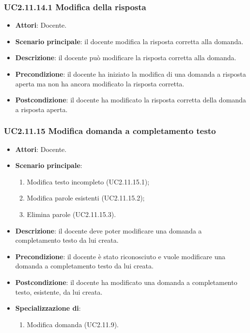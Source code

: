 \subsubsection{UC2.11.14.1 Modifica della risposta}
\begin{itemize}
\item \textbf{Attori}: Docente.
\item \textbf{Scenario principale}: il docente modifica la risposta corretta alla domanda.
\item \textbf{Descrizione}: il docente può modificare la risposta corretta alla domanda.
\item \textbf{Precondizione}: il docente ha iniziato la modifica di una domanda a risposta aperta ma non ha ancora modificato la risposta corretta.
\item \textbf{Postcondizione}: il docente ha modificato la risposta corretta della domanda a risposta aperta.
\end{itemize}
\subsubsection{UC2.11.15 Modifica domanda a completamento testo}
\begin{itemize}
\item \textbf{Attori}: Docente.
\item \textbf{Scenario principale}:
\begin{enumerate}
\item Modifica testo incompleto (UC2.11.15.1);
\item Modifica parole esistenti (UC2.11.15.2);
\item Elimina parole (UC2.11.15.3).
\end{enumerate}
\item \textbf{Descrizione}: il docente deve poter modificare una domanda a completamento testo da lui creata.
\item \textbf{Precondizione}: il docente è stato riconosciuto e vuole modificare una domanda a completamento testo da lui creata.
\item \textbf{Postcondizione}: il docente ha modificato una domanda a completamento testo, esistente, da lui creata.
\item \textbf{Specializzazione di}:
\begin{enumerate}
\item Modifica domanda (UC2.11.9).
\end{enumerate}
\end{itemize}
